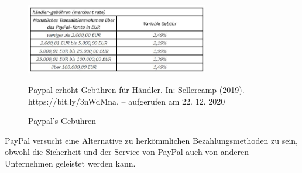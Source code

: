 \begin{figure}[h]
    \begin{center}
        \includegraphics[width=8cm]{media/paypal.png}
        \caption{Paypal's Gebühren}
        \label{gebühren-paypal}
        \bildquelle Paypal erhöht Gebühren für Händler. In: Sellercamp (2019). https://bit.ly/3nWdMna. – aufgerufen am 22. 12. 2020
    \end{center}
\end{figure}

\noindent PayPal versucht eine Alternative zu herkömmlichen Bezahlungsmethoden zu sein, obwohl die Sicherheit und der Service von PayPal auch von anderen Unternehmen geleistet werden kann.

